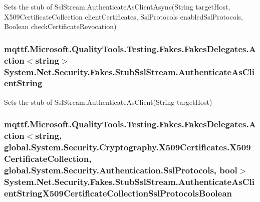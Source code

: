Sets the stub of Ssl\-Stream.\-Authenticate\-As\-Client\-Async(\-String target\-Host, X509\-Certificate\-Collection client\-Certificates, Ssl\-Protocols enabled\-Ssl\-Protocols, Boolean check\-Certificate\-Revocation)

\hypertarget{class_system_1_1_net_1_1_security_1_1_fakes_1_1_stub_ssl_stream_af4906fc30954ebacd34ec89df08d3d03}{
\subsubsection[{Authenticate\-As\-Client\-String}]{\setlength{\rightskip}{0pt plus 5cm}mqttf.\-Microsoft.\-Quality\-Tools.\-Testing.\-Fakes.\-Fakes\-Delegates.\-Action$<$string$>$ System.\-Net.\-Security.\-Fakes.\-Stub\-Ssl\-Stream.\-Authenticate\-As\-Client\-String}}\label{class_system_1_1_net_1_1_security_1_1_fakes_1_1_stub_ssl_stream_af4906fc30954ebacd34ec89df08d3d03}


Sets the stub of Ssl\-Stream.\-Authenticate\-As\-Client(\-String target\-Host)

\hypertarget{class_system_1_1_net_1_1_security_1_1_fakes_1_1_stub_ssl_stream_a08b5114caf51c0a9c93df57bf2c68f02}{
\subsubsection[{Authenticate\-As\-Client\-String\-X509\-Certificate\-Collection\-Ssl\-Protocols\-Boolean}]{\setlength{\rightskip}{0pt plus 5cm}mqttf.\-Microsoft.\-Quality\-Tools.\-Testing.\-Fakes.\-Fakes\-Delegates.\-Action$<$string, global.\-System.\-Security.\-Cryptography.\-X509\-Certificates.\-X509\-Certificate\-Collection, global.\-System.\-Security.\-Authentication.\-Ssl\-Protocols, bool$>$ System.\-Net.\-Security.\-Fakes.\-Stub\-Ssl\-Stream.\-Authenticate\-As\-Client\-String\-X509\-Certificate\-Collection\-Ssl\-Protocols\-Boolean}}\label{class_system_1_1_net_1_1_security_1_1_fakes_1_1_stub_ssl_stream_a08b5114caf51c0a9c93df57bf2c68f02}


